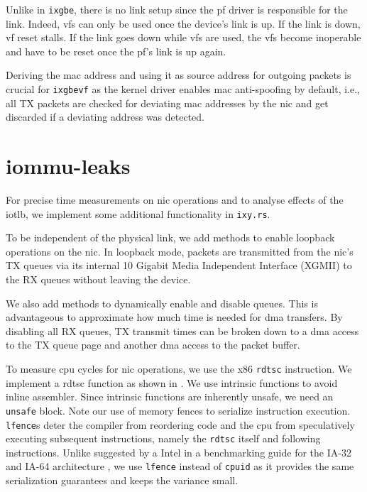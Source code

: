 Unlike in \texttt{ixgbe}, there is no link setup since the \ac{pf} driver is
responsible for the link. Indeed, \acp{vf} can only be used once the device's
link is up. If the link is down, \ac{vf} reset stalls. If the link goes down
while \acp{vf} are used, the \acp{vf} become inoperable and have to be reset
once the \ac{pf}'s link is up again.

Deriving the \ac{mac} address and using it as source address for outgoing
packets is crucial for \texttt{ixgbevf} as the kernel driver enables \ac{mac}
anti-spoofing by default, i.e., all TX packets are checked for deviating
\ac{mac} addresses by the \ac{nic} and get discarded if a deviating address was
detected.


\section{iommu-leaks}
\label{sec:iommu_leaks}

For precise time measurements on \ac{nic} operations and to analyse effects of
the \ac{iotlb}, we implement some additional functionality in \texttt{ixy.rs}.

To be independent of the physical link, we add methods to enable loopback
operations on the \ac{nic}. In loopback mode, packets are transmitted from the
\ac{nic}'s TX queues via its internal 10 Gigabit Media Independent Interface
(XGMII) to the RX queues without leaving the device.

We also add methods to dynamically enable and disable queues. This is
advantageous to approximate how much time is needed for \ac{dma} transfers. By
disabling all RX queues, TX transmit times can be broken down to a \ac{dma}
access to the TX queue page and another \ac{dma} access to the packet buffer.

To measure \ac{cpu} cycles for \ac{nic} operations, we use the x86
\texttt{rdtsc} instruction. We implement a rdtsc function as shown in
. We use intrinsic functions to avoid inline assembler. Since
intrinsic functions are inherently unsafe, we need an \texttt{unsafe} block.
Note our use of memory fences to serialize instruction execution.
\texttt{lfence}s deter the compiler from reordering code and the \ac{cpu} from
speculatively executing subsequent instructions, namely the \texttt{rdtsc}
itself and following instructions. Unlike suggested by a Intel in a benchmarking
guide for the IA-32 and IA-64 architecture \cite{paoloni2010benchmark}, we use
\texttt{lfence} instead of \texttt{cpuid} as it provides the same serialization
guarantees and keeps the variance small.

